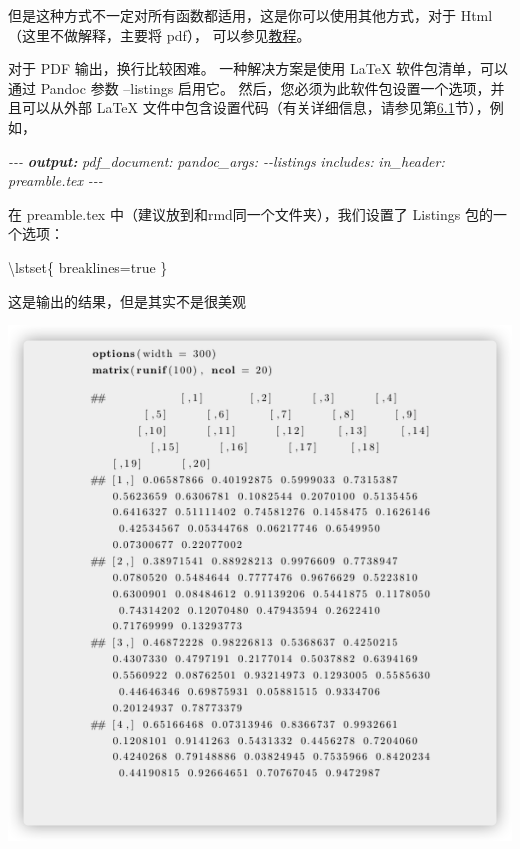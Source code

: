 \documentclass[
]{book}
\newenvironment{Shaded}{\begin{snugshade}}{\end{snugshade}}
\newcommand{\AnnotationTok}[1]{\textcolor[rgb]{0.56,0.35,0.01}{\textbf{\textit{#1}}}}
\newcommand{\CommentTok}[1]{\textcolor[rgb]{0.56,0.35,0.01}{\textit{#1}}}
\newcommand{\NormalTok}[1]{#1}
\begin{document}
但是这种方式不一定对所有函数都适用，这是你可以使用其他方式，对于 Html
（这里不做解释，主要将 pdf），
可以参见\href{https://bookdown.org/yihui/rmarkdown-cookbook/text-width.html}{教程}。

对于 PDF 输出，换行比较困难。 一种解决方案是使用 LaTeX
软件包清单，可以通过 Pandoc 参数 --listings 启用它。
然后，您必须为此软件包设置一个选项，并且可以从外部 LaTeX
文件中包含设置代码（有关详细信息，请参见第\href{https://bookdown.org/yihui/rmarkdown-cookbook/latex-preamble.html\#latex-preamble}{6.1}节），例如，

\begin{Shaded}
\begin{Highlighting}[]
\CommentTok{{-}{-}{-}}
\AnnotationTok{output:}
\CommentTok{  pdf\_document:}
\CommentTok{    pandoc\_args: {-}{-}listings}
\CommentTok{    includes:}
\CommentTok{      in\_header: preamble.tex}
\CommentTok{{-}{-}{-}}
\end{Highlighting}
\end{Shaded}

在 preamble.tex 中（建议放到和rmd同一个文件夹），我们设置了 Listings
包的一个选项：

\begin{Shaded}
\begin{Highlighting}[]
\NormalTok{\textbackslash{}lstset\{}
\NormalTok{  breaklines=true}
\NormalTok{\}}
\end{Highlighting}
\end{Shaded}

这是输出的结果，但是其实不是很美观

\includegraphics{images/paste-3C23FCC2.png}
\end{document}

